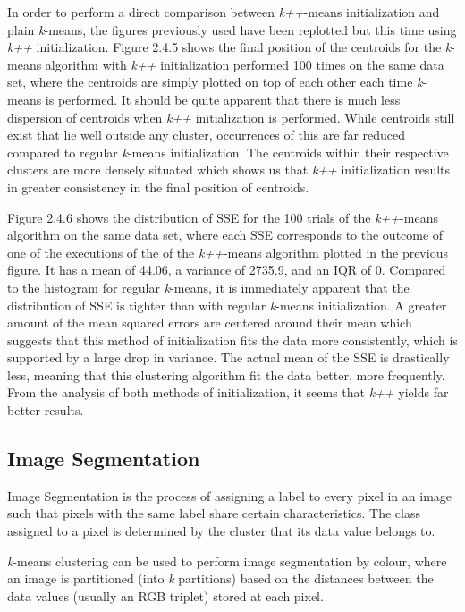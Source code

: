 \documentclass[12pt]{article}
\begin{document}
  \par In order to perform a direct comparison between \textit{k++}-means initialization and plain \textit{k}-means, the figures previously used have been replotted but this time using \textit{k++} initialization. Figure 2.4.5 shows the final position of the centroids for the \textit{k}-means algorithm with \textit{k++} initialization performed 100 times on the same data set, where the centroids are simply plotted on top of each other each time \textit{k}-means is performed. It should be quite apparent that there is much less dispersion of centroids when \textit{k++} initialization is performed. While centroids still exist that lie well outside any cluster, occurrences of this are far reduced compared to regular \textit{k}-means initialization. The centroids within their respective clusters are more densely situated which shows us that \textit{k++} initialization results in greater consistency in the final position of centroids.

  \par Figure 2.4.6 shows the distribution of SSE for the 100 trials of the \textit{k++}-means algorithm on the same data set, where each SSE corresponds to the outcome of one of the executions of the of the \textit{k++}-means algorithm plotted in the previous figure. It has a mean of 44.06, a variance of 2735.9, and an IQR of 0. Compared to the histogram for regular \textit{k}-means, it is immediately apparent that the distribution of SSE is tighter than with regular \textit{k}-means initialization. A greater amount of the mean squared errors are centered around their mean which suggests that this method of initialization fits the data more consistently, which is supported by a large drop in variance. The actual mean of the SSE is drastically less, meaning that this clustering algorithm fit the data better, more frequently. From the analysis of both methods of initialization, it seems that \textit{k++} yields far better results.

\subsection {Image Segmentation}
  \par Image Segmentation is the process of assigning a label to every pixel in an image such that pixels with the same label share certain characteristics. \cite{is_1} The class assigned to a pixel is determined by the cluster that its data value belongs to.

  \par \textit{k}-means clustering can be used to perform image segmentation by colour, where an image is partitioned (into \textit{k} partitions) based on the distances between the data values (usually an RGB triplet) stored at each pixel.
\end{document}
